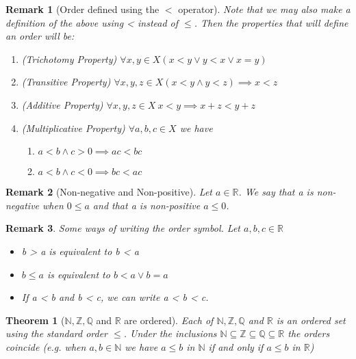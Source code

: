 \documentclass[11pt, oneside]{book}
\theoremstyle{break}
\newtheorem{thm}{Theorem}[section]
\newtheorem*{remark}{Remark}
\newcommand{\bb}[1]{\mathbb{#1}}			%
\begin{document}
\begin{remark}[Order defined using the $<$ operator]
	Note that we may also make a definition of the above using < instead of $\leq$. Then the properties that will define an order will be:
	\begin{enumerate}
		\item (Trichotomy Property) $\forall x, y \in X (x < y \lor y < x \lor x = y)$
		\item (Transitive Property) $\forall x, y, z \in X (x < y \land y < z) \implies x < z$
		\item (Additive Property) $\forall x, y, z \in X \> x < y \implies x + z < y + z$
		\item (Multiplicative Property) $\forall a, b, c \in X$ we have
		\begin{enumerate}
			\item $a < b \land c > 0 \implies ac < bc$ 
			\item $a < b \land c < 0 \implies bc < ac$

		\end{enumerate}
	\end{enumerate}
\end{remark}

\begin{remark}[Non-negative and Non-positive]
	 Let $a \in \bb{R}$. We say that a is non-negative when $0 \leq a$ and that a is non-positive $a \leq 0$.
\end{remark}

\begin{remark}
	Some ways of writing the order symbol. Let $a, b, c \in \bb{R}$
	\begin{itemize}
		\item b > a is equivalent to b < a
		\item $b \leq a$ is equivalent to $b < a \lor b = a$
		\item If a < b and b < c, we can write a < b < c.
	\end{itemize}
\end{remark}

\begin{thm}[$\bb{N}, \bb{Z}, \bb{Q}$ and $\bb{R}$ are ordered]
	Each of $\bb{N}, \bb{Z}, \bb{Q}$ and $\bb{R}$  is an ordered set using the standard order $\leq$. Under the inclusions $\bb{N} \subseteq \bb{Z} \subseteq \bb{Q} \subseteq \bb{R}$ the orders coincide (e.g. when $a, b \in \bb{N}$ we have $a \leq b$ in $\bb{N}$ if and only if $a \leq b$ in $\bb{R}$)
\end{thm}
\end{document}
